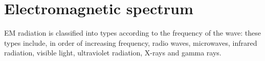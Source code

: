          \section{Electromagnetic spectrum}
    \nopagebreak
            \nopagebreak
EM radiation is classified into types according to the frequency of the wave: these types include, in order of increasing frequency, radio waves, microwaves, infrared radiation, visible light, ultraviolet radiation, X-rays and gamma rays.\par 
      
